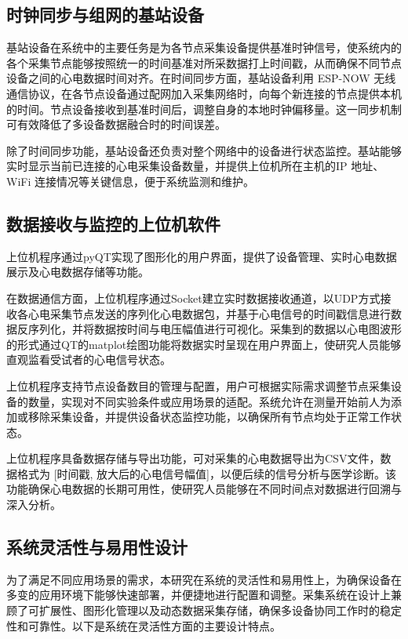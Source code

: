 \subsection{时钟同步与组网的基站设备}

基站设备在系统中的主要任务是为各节点采集设备提供基准时钟信号，使系统内的各个采集节点能够按照统一的时间基准对所采数据打上时间戳，从而确保不同节点设备之间的心电数据时间对齐。在时间同步方面，基站设备利用 ESP-NOW 无线通信协议，在各节点设备通过配网加入采集网络时，向每个新连接的节点提供本机的时间。节点设备接收到基准时间后，调整自身的本地时钟偏移量。这一同步机制可有效降低了多设备数据融合时的时间误差。

除了时间同步功能，基站设备还负责对整个网络中的设备进行状态监控。基站能够实时显示当前已连接的心电采集设备数量，并提供上位机所在主机的IP 地址、WiFi 连接情况等关键信息，便于系统监测和维护。

\subsection{数据接收与监控的上位机软件}

上位机程序通过pyQT实现了图形化的用户界面，提供了设备管理、实时心电数据展示及心电数据存储等功能。

在数据通信方面，上位机程序通过Socket建立实时数据接收通道，以UDP方式接收各心电采集节点发送的序列化心电数据包，并基于心电信号的时间戳信息进行数据反序列化，并将数据按时间与电压幅值进行可视化。采集到的数据以心电图波形的形式通过QT的matplot绘图功能将数据实时呈现在用户界面上，使研究人员能够直观监看受试者的心电信号状态。

上位机程序支持节点设备数目的管理与配置，用户可根据实际需求调整节点采集设备的数量，实现对不同实验条件或应用场景的适配。系统允许在测量开始前人为添加或移除采集设备，并提供设备状态监控功能，以确保所有节点均处于正常工作状态。 

上位机程序具备数据存储与导出功能，可对采集的心电数据导出为CSV文件，数据格式为 [时间戳, 放大后的心电信号幅值]，以便后续的信号分析与医学诊断。该功能确保心电数据的长期可用性，使研究人员能够在不同时间点对数据进行回溯与深入分析。

\subsection{系统灵活性与易用性设计}

为了满足不同应用场景的需求，本研究在系统的灵活性和易用性上，为确保设备在多变的应用环境下能够快速部署，并便捷地进行配置和调整。采集系统在设计上兼顾了可扩展性、图形化管理以及动态数据采集存储，确保多设备协同工作时的稳定性和可靠性。以下是系统在灵活性方面的主要设计特点。


